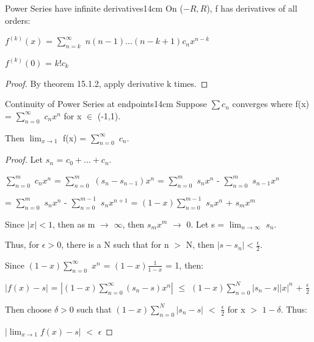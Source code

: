     \vspace{0.5cm}



    \begin{corollary}{Power Series have infinite derivatives}{14cm}
        On ($-R,R$), f has derivatives of all orders:

        \hspace{0.5cm}
        $f^{(k)}(x)$ = $\sum_{n=k}^{\infty}$ $n(n-1)...(n-k+1)c_nx^{n-k}$

        \hspace{0.5cm}
        $f^{(k)}(0)$ = $k!c_k$
    \end{corollary}

    \begin{proof}
        By {\color{red} theorem 15.1.2}, apply derivative k times.
    \end{proof}

    \vspace{0.5cm}



    \begin{wtheorem}{Continuity of Power Series at endpoints}{14cm}
        Suppose $\sum c_n$ converges where f(x) = $\sum_{n=0}^{\infty}$ $c_n x^n$
        for x $\in$ (-1,1).
        
        Then $\lim_{x \rightarrow 1}$ f(x) = $\sum_{n=0}^{\infty}$ $c_n$.
    \end{wtheorem}

    \begin{proof}
        Let $s_n$ = $c_0 + ... + c_n$.

        \hspace{0.5cm}
        $\sum_{n=0}^m$ $c_nx^n$
        = $\sum_{n=0}^m$ $(s_n - s_{n-1})x^n$
        = $\sum_{n=0}^m$ $s_nx^n$ - $\sum_{n=0}^m$ $s_{n-1}x^n$

        \hspace{2.6cm}
        = $\sum_{n=0}^m$ $s_nx^n$ - $\sum_{n=0}^{m-1}$ $s_nx^{n+1}$
        = $(1-x)\sum_{n=0}^{m-1}$ $s_nx^n$ + $s_mx^m$

        Since $|x| < 1$, then as m $\rightarrow$ $\infty$, then $s_mx^m$
        $\rightarrow$ 0. Let s = $\lim_{n \rightarrow \infty}$ $s_n$.

        Thus, for $\epsilon > 0$, there is a N such that for n $>$ N, then
        $|s - s_n| < \frac{\epsilon}{2}$.

        Since $(1-x) \sum_{n=0}^{\infty}$ $x^n$ = $(1-x)\frac{1}{1-x}$ = 1, then:

        \hspace{0.5cm}
        $|f(x) - s|$
        = $|(1-x) \sum_{n=0}^{\infty} (s_n-s)x^n|$
        $\leq$ $(1-x) \sum_{n=0}^N |s_n - s| |x|^n$ + $\frac{\epsilon}{2}$

        Then choose $\delta > 0$ such that
        $(1-x) \sum_{n=0}^N |s_n - s|$ $<$ $\frac{\epsilon}{2}$
        for x $>$ $1-\delta$. Thus:

        \hspace{0.5cm}
        $|\lim_{x \rightarrow 1} f(x) - s|$ $<$ $\epsilon$
    \end{proof}


